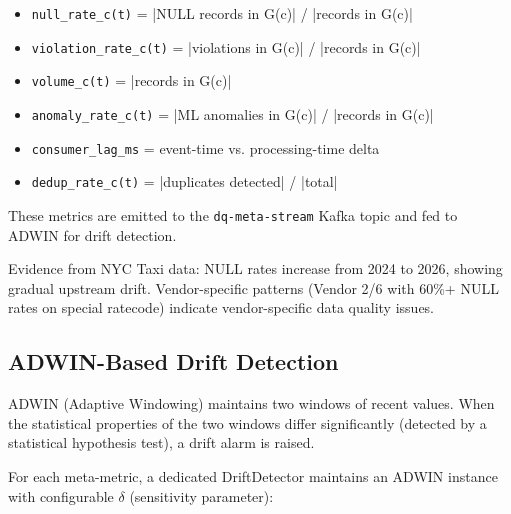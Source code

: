 \begin{itemize}
    \item \texttt{null\_rate\_c(t)} = |NULL records in G(c)| / |records in G(c)|
    \item \texttt{violation\_rate\_c(t)} = |violations in G(c)| / |records in G(c)|
    \item \texttt{volume\_c(t)} = |records in G(c)|
    \item \texttt{anomaly\_rate\_c(t)} = |ML anomalies in G(c)| / |records in G(c)|
    \item \texttt{consumer\_lag\_ms} = event-time vs. processing-time delta
    \item \texttt{dedup\_rate\_c(t)} = |duplicates detected| / |total|
\end{itemize}

These metrics are emitted to the \texttt{dq-meta-stream} Kafka topic and fed to ADWIN for drift detection.

Evidence from NYC Taxi data: NULL rates increase from 2024 to 2026, showing gradual upstream drift. Vendor-specific patterns (Vendor 2/6 with 60\%+ NULL rates on special ratecode) indicate vendor-specific data quality issues.

\subsection{ADWIN-Based Drift Detection}

ADWIN (Adaptive Windowing) maintains two windows of recent values. When the statistical properties of the two windows differ significantly (detected by a statistical hypothesis test), a drift alarm is raised.

For each meta-metric, a dedicated DriftDetector maintains an ADWIN instance with configurable $\delta$ (sensitivity parameter):


